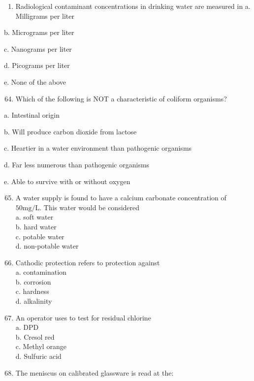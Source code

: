 \documentclass[10pt]{article}
\begin{document}
\begin{enumerate}
  \item Radiological contaminant concentrations in drinking water are measured in a. Milligrams per liter\\

\end{enumerate}

b. Micrograms per liter

c. Nanograms per liter

d. Picograms per liter

e. None of the above

\begin{enumerate}
  \setcounter{enumi}{63}
  \item Which of the following is NOT a characteristic of coliform organisms?
\end{enumerate}

a. Intestinal origin

b. Will produce carbon dioxide from lactose

c. Heartier in a water environment than pathogenic organisms

d. Far less numerous than pathogenic organisms

e. Able to survive with or without oxygen

\begin{enumerate}
  \setcounter{enumi}{64}
  \item A water supply is found to have a calcium carbonate concentration of $50 \mathrm{mg} / \mathrm{L}$. This water would be considered\\
a. soft water\\
b. hard water\\
c. potable water\\
d. non-potable water\\

  \item Cathodic protection refers to protection against\\
a. contamination\\
b. corrosion\\
c. hardness\\
d. alkalinity\\

  \item An operator uses to test for residual chlorine\\
a. DPD\\
b. Cresol red\\
c. Methyl orange\\
d. Sulfuric acid\\

  \item The meniscus on calibrated glassware is read at the:

\end{enumerate}
\end{document}
